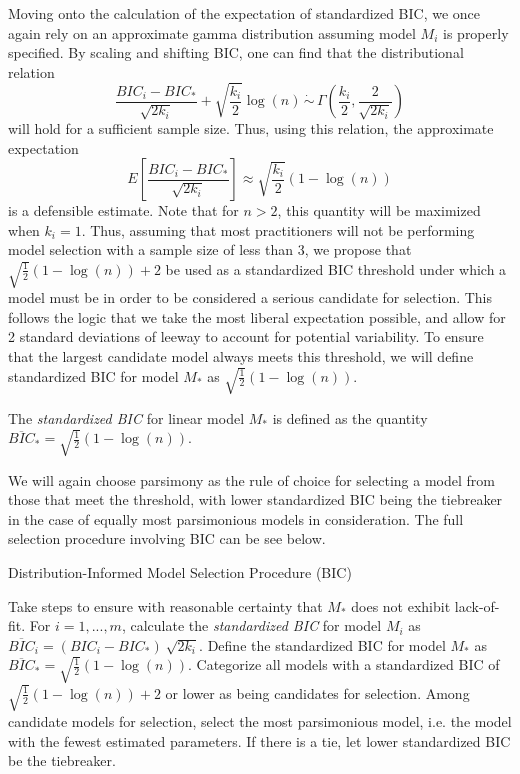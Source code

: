 		Moving onto the calculation of the expectation of standardized BIC, we once again rely on an approximate gamma distribution assuming model $M_i$ is properly specified.
		By scaling and shifting BIC, one can find that the distributional relation
		\begin{equation}
			\frac{BIC_i - BIC_*}{\sqrt{2k_i}} + \sqrt{\frac{k_i}{2}} \log(n) \, \dot\sim \, \Gamma \left( \frac{k_i}{2}, \frac{2}{\sqrt{2k_i}} \right)
		\end{equation}
		will hold for a sufficient sample size. Thus, using this relation, the approximate expectation
		\begin{equation}
			E \left[ \frac{BIC_i - BIC_*}{\sqrt{2k_i}} \right] \approx \sqrt{\frac{k_i}{2}} (1-\log(n))
		\end{equation}
		is a defensible estimate. Note that for $n > 2$, this quantity will be maximized when $k_i = 1$. Thus, assuming that most practitioners will not be performing model
		selection with a sample size of less than 3, we propose that $\sqrt{\frac{1}{2}} (1-\log(n)) + 2$ be used as a standardized BIC threshold under which a model must be
		in order to be considered a serious candidate for selection. This follows the logic that we take the most liberal expectation possible, and allow for 2 standard
		deviations of leeway to account for potential variability. To ensure that the largest candidate model always meets this threshold, we will define standardized BIC
		for model $M_*$ as $\sqrt{\frac{1}{2}} (1-\log(n))$.
		\begin{definition}
			The \textit{standardized BIC} for linear model $M_*$ is defined as the quantity $\overline{BIC}_* = \sqrt{\frac{1}{2}} (1-\log(n))$.
		\end{definition}
		
		We will again choose parsimony as the rule of choice for selecting a model from those that meet the threshold, with lower standardized BIC being the tiebreaker in the
		case of equally most parsimonious models in consideration. The full selection procedure involving BIC can be see below.
		\begin{algorithm}[H]
			\caption{Distribution-Informed Model Selection Procedure (BIC)}
			\begin{algorithmic}[1]
			  \State Take steps to ensure with reasonable certainty that $M_*$ does not exhibit lack-of-fit.
			  \State For $i = 1,...,m$, calculate the \textit{standardized BIC} for model $M_i$ as 
			  $\overline{BIC}_i = (BIC_i - BIC_*) \ \sqrt{2k_i}$. Define the standardized BIC for model
			  $M_*$ as $\overline{BIC}_* = \sqrt{\frac{1}{2}} (1-\log(n))$.
			  \State Categorize all models with a standardized BIC of $\sqrt{\frac{1}{2}} (1-\log(n)) + 2$ or lower as
			  being candidates for selection.
			  \State Among candidate models for selection, select the most parsimonious model, i.e. the model
			  with the fewest estimated parameters. If there is a tie, let lower standardized BIC be the
			  tiebreaker.
			\end{algorithmic}
		\end{algorithm}

